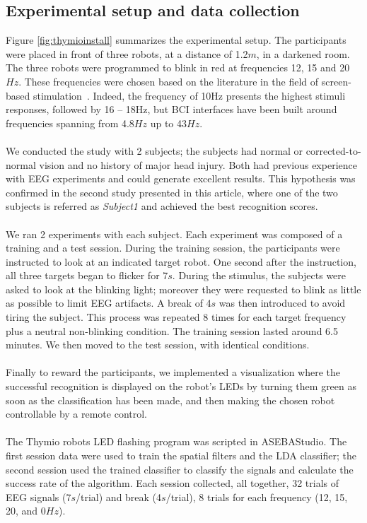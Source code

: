\documentclass[smallextended]{svjour3}
\begin{document}
\subsection{Experimental setup and data collection}
Figure \ref{fig:thymioinstall} summarizes the experimental setup. The participants were placed in front of three robots, at a distance of 1.2$m$, in a darkened room. The three robots were programmed to blink in red at frequencies 12, 15 and 20$Hz$. These frequencies were chosen based on the literature in the field of screen-based stimulation~\cite{Zhu2010}.
Indeed, the frequency of 10Hz presents the highest stimuli responses, followed by 16 -- 18Hz, but BCI interfaces have been built around frequencies spanning from 4.8$Hz$ up to 43$Hz$.\\
\\
We conducted the study with 2 subjects; the subjects had normal or corrected-to-normal vision and no history of major head injury. Both had previous experience with EEG experiments and could generate excellent results. This hypothesis was confirmed in the second study presented in this article, where one of the two subjects is referred as \textit{Subject1} and achieved the best recognition scores. \\
\\
We ran 2 experiments with each subject. Each experiment was composed of a training and a test session. During the training session, the participants were instructed to look at an indicated target robot. One second after the instruction, all three targets began to flicker for 7$s$. During the stimulus, the subjects were asked to look at the blinking light; moreover they were requested to blink as little as possible to limit EEG artifacts. A break of 4$s$ was then introduced to avoid tiring the subject. This process was repeated 8 times for each target frequency plus a neutral non-blinking condition. The training session lasted around 6.5 minutes. We then moved to the test session, with identical conditions.\\
\\
Finally to reward the participants, we implemented a visualization where the successful recognition is displayed on the robot's LEDs by turning them green as soon as the classification has been made, and then making the chosen robot controllable by a remote control.\\
\\
The Thymio robots LED flashing program was scripted in ASEBAStudio. The first session data were used to train the spatial filters and the LDA classifier; the second session used the trained classifier to classify the signals and calculate the success rate of the algorithm. Each session collected, all together, 32 trials of EEG signals (7$s$/trial) and break (4$s$/trial), 8 trials for each frequency (12, 15, 20, and 0$Hz$). 
\end{document}
